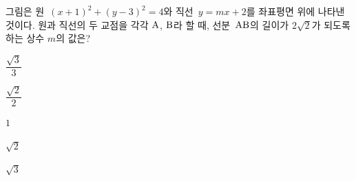 그림은 원~$(x+1)^2+(y-3)^2=4$와 직선~$y=mx+2$를 좌표평면 위에 나타낸 것이다. 원과 직선의 두 교점을 각각 $\mathrm{A}$, $\mathrm{B}$라 할 때, 선분~$\mathrm{AB}$의 길이가 $2\sqrt{2}$가 되도록 하는 상수 $m$의 값은?
\par\smallskip\begin{center}\resizebox{\ifdim\width>\linewidth\linewidth\else\width\fi}{!}{}\end{center}
\begin{choices32}{\rule[-3ex]{0pt}{8ex}$\dfrac{\sqrt{3}}{3}$}{\rule[-3ex]{0pt}{8ex}$\dfrac{\sqrt{2}}{2}$}{\rule[-3ex]{0pt}{8ex}$1$}{\rule[-3ex]{0pt}{8ex}$\sqrt{2}$}{\rule[-3ex]{0pt}{8ex}$\sqrt{3}$}\end{choices32}
